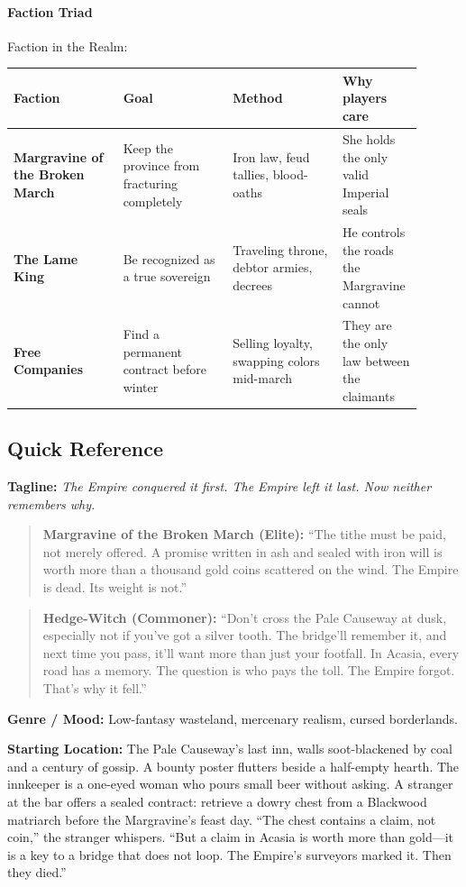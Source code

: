 \begin{tcolorbox}[colback=black!5,colframe=blue!60!black,title={Region Diagnostic Summary},breakable]
\paragraph*{Faction Triad}
Faction in the Realm:
\begin{tabular}{|p{0.25\linewidth}|p{0.25\linewidth}|p{0.25\linewidth}|p{0.15\linewidth}|}
\hline
\textbf{Faction} & \textbf{Goal} & \textbf{Method} & \textbf{Why players care} \\
\hline
\textbf{Margravine of the Broken March} & Keep the province from fracturing completely & Iron law, feud tallies, blood-oaths & She holds the only valid Imperial seals \\
\hline
\textbf{The Lame King} & Be recognized as a true sovereign & Traveling throne, debtor armies, decrees & He controls the roads the Margravine cannot \\
\hline
\textbf{Free Companies} & Find a permanent contract before winter & Selling loyalty, swapping colors mid-march & They are the only law between the claimants \\
\hline
\end{tabular}
\end{tcolorbox}

\subsection*{Quick Reference}
\textbf{Tagline:} \textit{The Empire conquered it first. The Empire left it last. Now neither remembers why.}

\begin{quote}
  \textbf{Margravine of the Broken March (Elite):}  
  ``The tithe must be paid, not merely offered. A promise written in ash and sealed with iron will is worth more than a thousand gold coins scattered on the wind. The Empire is dead. Its weight is not.''
\end{quote}

\begin{quote}
  \textbf{Hedge-Witch (Commoner):}  
  ``Don't cross the Pale Causeway at dusk, especially not if you've got a silver tooth. The bridge'll remember it, and next time you pass, it'll want more than just your footfall. In Acasia, every road has a memory. The question is who pays the toll. The Empire forgot. That's why it fell.''
\end{quote}

\textbf{Genre / Mood:} Low-fantasy wasteland, mercenary realism, cursed borderlands.

\textbf{Starting Location:} The Pale Causeway's last inn, walls soot-blackened by coal and a century of gossip. A bounty poster flutters beside a half-empty hearth. The innkeeper is a one-eyed woman who pours small beer without asking. A stranger at the bar offers a sealed contract: retrieve a dowry chest from a Blackwood matriarch before the Margravine's feast day. ``The chest contains a claim, not coin,'' the stranger whispers. ``But a claim in Acasia is worth more than gold---it is a key to a bridge that does not loop. The Empire's surveyors marked it. Then they died.''

